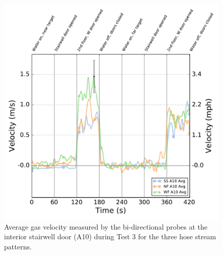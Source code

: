 \documentclass[12pt,oneside]{book}
\begin{document}
\begin{figure}[!ht]
	\includegraphics[width=\columnwidth]{../Figures/Plots/Test_17_West_063014_BDP_A10_stream_avgs}
	\caption[Average gas velocity through the interior stairwell door during Test 3 for the three hose stream patterns.]{Average gas velocity measured by the bi-directional probes at the interior stairwell door (A10) during Test 3 for the three hose stream patterns.}
	\label{fig:Test_3_BDP_A10_Avg_All}
	\end{figure}
\FloatBarrier
\end{document}

